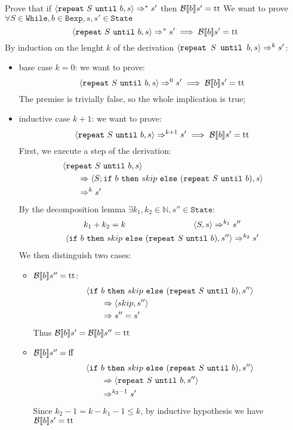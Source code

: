 \begin{exercise}{
    Prove that if $\left<\texttt{repeat}\ S\ \texttt{until}\ b, s\right> \Rightarrow^* s'$ then $\mathcal{B} \llbracket b \rrbracket s' = \text{tt}$
}
    We want to prove $\forall S \in \texttt{While}, b \in \texttt{Bexp}, s, s' \in \texttt{State}$
    \[ \left<\texttt{repeat}\ S\ \texttt{until}\ b, s\right> \Rightarrow^* s' \implies \mathcal{B} \llbracket b \rrbracket s' = \text{tt} \]
    By induction on the lenght $k$ of the derivation $\left<\texttt{repeat } S \texttt{ until } b, s\right> \Rightarrow^k s'$:
    \begin{itemize}
        \item base case $k=0$: we want to prove:
            \[ \left<\texttt{repeat}\ S\ \texttt{until}\ b, s\right> \Rightarrow^0 s' \implies \mathcal{B} \llbracket b \rrbracket s' = \text{tt} \]
            The premise is trivially false, so the whole implication is true;
        \item inductive case $k+1$: we want to prove:
            \[ \left<\texttt{repeat}\ S\ \texttt{until}\ b, s\right> \Rightarrow^{k+1} s' \implies \mathcal{B} \llbracket b \rrbracket s' = \text{tt} \]
            First, we execute a step of the derivation:
            \begin{align*}
                &\left<\texttt{repeat}\ S\ \texttt{until}\ b, s\right>
                \\&\qquad \Rightarrow \left<S; \texttt{if}\ b\ \texttt{then}\ skip\ \texttt{else}\ (\texttt{repeat}\ S\ \texttt{until}\ b), s\right>
                \\&\qquad \Rightarrow^k s'
            \end{align*}
            By the decomposition lemma $\exists k_1, k_2 \in \mathbb{N}, s'' \in \texttt{State} :$
            \begin{gather*}
                k_1 + k_2 = k \qquad\qquad\qquad\qquad
                \left<S, s\right> \Rightarrow^{k_1} s'' \\
                \left<\texttt{if}\ b\ \texttt{then}\ skip\ \texttt{else}\ (\texttt{repeat}\ S\ \texttt{until}\ b), s''\right> \Rightarrow^{k_2} s'
            \end{gather*}
            We then distinguish two cases:
            \begin{itemize}
                \item $\mathcal{B} \llbracket b \rrbracket s'' = \text{tt}$:
                    \begin{align*}
                        &\left<\texttt{if}\ b\ \texttt{then}\ skip\ \texttt{else}\ (\texttt{repeat}\ S\ \texttt{until}\ b), s''\right>
                        \\&\qquad \Rightarrow \left<skip, s''\right>
                        \\&\qquad \Rightarrow s'' = s'
                    \end{align*}
                    Thus $\mathcal{B} \llbracket b \rrbracket s' = \mathcal{B} \llbracket b \rrbracket s'' = \text{tt}$
                \item $\mathcal{B} \llbracket b \rrbracket s'' = \text{ff}$
                    \begin{align*}
                        &\left<\texttt{if}\ b\ \texttt{then}\ skip\ \texttt{else}\ (\texttt{repeat}\ S\ \texttt{until}\ b), s''\right>
                        \\&\qquad \Rightarrow \left<\texttt{repeat}\ S\ \texttt{until}\ b, s''\right>
                        \\&\qquad \Rightarrow^{k_2 - 1} s'
                    \end{align*}
                    Since $k_2 - 1 = k - k_1 - 1 \leq k$, by inductive hypothesis we have $\mathcal{B} \llbracket b \rrbracket s' = \text{tt}$
            \end{itemize}
    \end{itemize}
\end{exercise}

